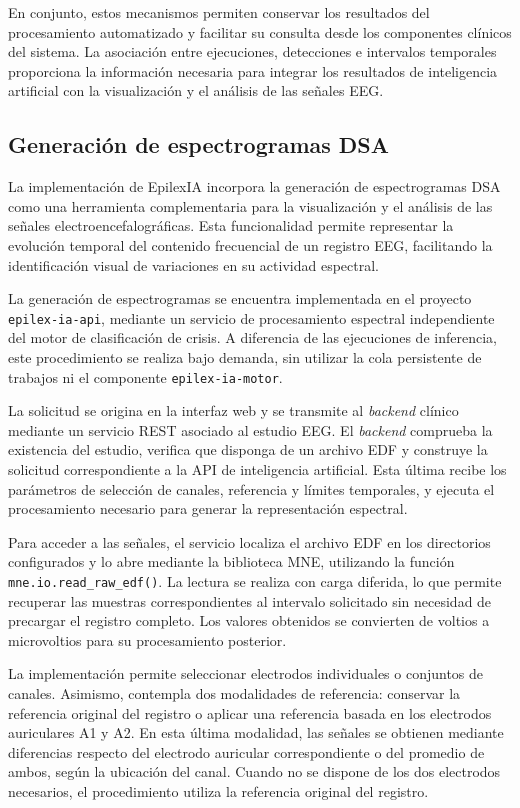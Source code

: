 En conjunto, estos mecanismos permiten conservar los
resultados del procesamiento automatizado y facilitar
su consulta desde los componentes clínicos del sistema.
La asociación entre ejecuciones, detecciones e intervalos
temporales proporciona la información necesaria para
integrar los resultados de inteligencia artificial
con la visualización y el análisis de las señales EEG.

\subsection{Generación de espectrogramas DSA}

La implementación de EpilexIA incorpora la generación de
espectrogramas DSA como
una herramienta complementaria para la visualización y el
análisis de las señales electroencefalográficas. Esta
funcionalidad permite representar la evolución temporal
del contenido frecuencial de un registro EEG, facilitando
la identificación visual de variaciones en su actividad
espectral.

La generación de espectrogramas se encuentra implementada
en el proyecto \texttt{epilex-ia-api}, mediante un servicio
de procesamiento espectral independiente del motor de
clasificación de crisis. A diferencia de las ejecuciones
de inferencia, este procedimiento se realiza bajo demanda,
sin utilizar la cola persistente de trabajos ni el
componente \texttt{epilex-ia-motor}.

La solicitud se origina en la interfaz web y se transmite
al \textit{backend} clínico mediante un servicio REST asociado al
estudio EEG. El \textit{backend} comprueba la existencia del estudio,
verifica que disponga de un archivo EDF y construye la
solicitud correspondiente a la API de inteligencia
artificial. Esta última recibe los parámetros de selección
de canales, referencia y límites temporales, y ejecuta
el procesamiento necesario para generar la representación
espectral.

Para acceder a las señales, el servicio localiza el archivo
EDF en los directorios configurados y lo abre mediante
la biblioteca MNE, utilizando la función
\texttt{mne.io.read\_raw\_edf()}. La lectura se realiza
con carga diferida, lo que permite recuperar las muestras
correspondientes al intervalo solicitado sin necesidad
de precargar el registro completo. Los valores obtenidos
se convierten de voltios a microvoltios para su
procesamiento posterior.

La implementación permite seleccionar electrodos
individuales o conjuntos de canales. Asimismo, contempla
dos modalidades de referencia: conservar la referencia
original del registro o aplicar una referencia basada
en los electrodos auriculares A1 y A2. En esta última
modalidad, las señales se obtienen mediante diferencias
respecto del electrodo auricular correspondiente o del
promedio de ambos, según la ubicación del canal. Cuando
no se dispone de los dos electrodos necesarios, el
procedimiento utiliza la referencia original del registro.

